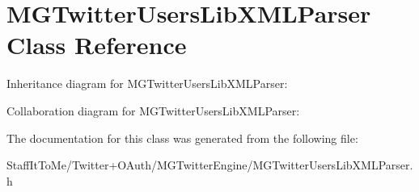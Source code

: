 \hypertarget{interface_m_g_twitter_users_lib_x_m_l_parser}{
\section{\-M\-G\-Twitter\-Users\-Lib\-X\-M\-L\-Parser \-Class \-Reference}
\label{interface_m_g_twitter_users_lib_x_m_l_parser}
}


\-Inheritance diagram for \-M\-G\-Twitter\-Users\-Lib\-X\-M\-L\-Parser\-:


\-Collaboration diagram for \-M\-G\-Twitter\-Users\-Lib\-X\-M\-L\-Parser\-:


\-The documentation for this class was generated from the following file\-:\begin{DoxyCompactItemize}
\item 
\-Staff\-It\-To\-Me/\-Twitter+\-O\-Auth/\-M\-G\-Twitter\-Engine/\-M\-G\-Twitter\-Users\-Lib\-X\-M\-L\-Parser.\-h\end{DoxyCompactItemize}
